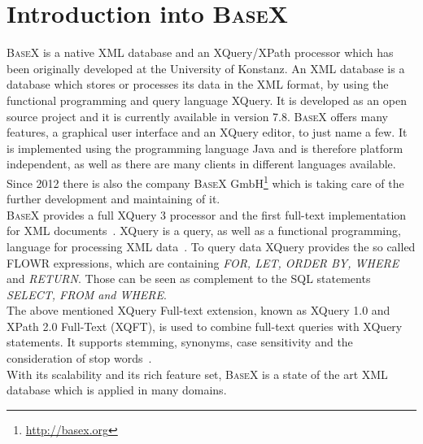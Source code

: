 \section{Introduction into \textsc{BaseX}}
\label{sec:overview:introduction-into-basex}
\textsc{BaseX} is a native XML database and an XQuery/XPath processor which has been originally developed at the University of Konstanz.
An XML database is a database which stores or processes its data in the XML format, by using the functional programming and query language XQuery.
It is developed as an open source project and it is currently available in version 7.8.
\textsc{BaseX} offers many features, a graphical user interface and an XQuery editor, to just name a few.
It is implemented using the programming language Java and is therefore platform independent, as well as there are many clients in different languages available.
Since 2012 there is also the company \textsc{BaseX} GmbH\footnote{\url{http://basex.org}} which is taking care of the further development and maintaining of it.\\
\textsc{BaseX} provides a full XQuery 3 processor and the first full-text implementation for XML documents~\cite{grun2009xquery}.
XQuery is a query, as well as a functional programming, language for processing XML data~\cite{boag2002xquery}.
To query data XQuery provides the so called FLOWR expressions, which are containing \textit{FOR, LET, ORDER BY, WHERE} and \textit{RETURN}.
Those can be seen as complement to the SQL statements \textit{SELECT, FROM and WHERE}.\\
The above mentioned XQuery Full-text extension, known as XQuery 1.0 and XPath 2.0 Full-Text (XQFT), is used to combine full-text queries with XQuery statements.
It supports stemming, synonyms, case sensitivity and the consideration of stop words~\cite{amer2006xquery}.\\
With its scalability and its rich feature set, \textsc{BaseX} is a state of the art XML database which is applied in many domains.


